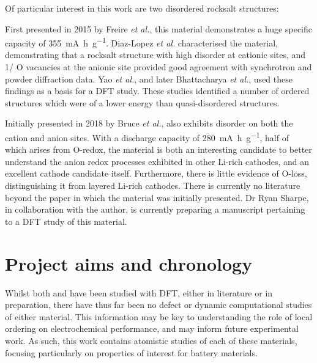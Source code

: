 Of particular interest in this work are two disordered rocksalt structures:

\begin{labeling}{\textbf{}}
\item [\textbf{\ce{Li4Mn2O5}}] First presented in 2015 by Freire \textit{et al.},\cite{Freire2016} this material demonstrates a huge specific capacity of \SI{355}{\milli\ampere\hour\per\gram}.
Diaz-Lopez \textit{et al.}\cite{Diaz-Lopez2018} characterised the material, demonstrating that a  rocksalt structure with high  disorder at cationic sites, and 1/ O vacancies at the anionic site provided good agreement with synchrotron and powder diffraction data.
Yao \textit{et al.}\cite{Diaz-Lopez2017}, and later Bhattacharya \textit{et al.}, used these findings as a basis for a DFT study.
These studies identified a number of ordered structures which were of a lower energy than quasi-disordered structures.

\item [\textbf{\ce{Li2MnO2F}}] Initially presented in 2018 by Bruce \textit{et al.},\cite{House2018}  also exhibits disorder on both the cation and anion sites.
With a discharge capacity of \SI{280}{\milli\ampere\hour\per\gram}, half of which arises from O-redox, the material is both an interesting candidate to better understand the anion redox processes exhibited in other Li-rich cathodes, and an excellent cathode candidate itself.
Furthermore, there is little evidence of O-loss, distinguishing it from layered Li-rich cathodes.
There is currently no literature beyond the paper in which the material was initially presented. 
Dr Ryan Sharpe, in collaboration with the author, is currently preparing a manuscript pertaining to a DFT study of this material.
\end{labeling}

\section{Project aims and chronology}
Whilst both  and  have been studied with DFT, either in literature or in preparation, there have thus far been no defect or dynamic computational studies of either material.
This information may be key to understanding the role of local ordering on electrochemical performance, and may inform future experimental work.
As such, this work contains atomistic studies of each of these materials, focusing particularly on properties of interest for battery materials.

